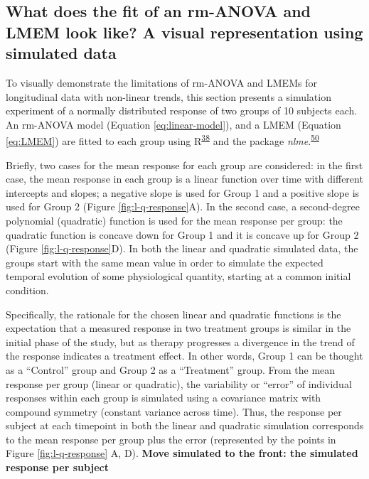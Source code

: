 \documentclass[
]{article}
\begin{document}
\hypertarget{simulation}{%
\subsection{What does the fit of an rm-ANOVA and LMEM look like? A visual representation using simulated data}\label{simulation}}

To visually demonstrate the limitations of rm-ANOVA and LMEMs for longitudinal data with non-linear trends, this section presents a simulation experiment of a normally distributed response of two groups of 10 subjects each. An rm-ANOVA model (Equation \eqref{eq:linear-model}), and a LMEM (Equation \eqref{eq:LMEM}) are fitted to each group using R\textsuperscript{\protect\hyperlink{ref-r}{38}} and the package \emph{nlme}.\textsuperscript{\protect\hyperlink{ref-nlme}{50}}

Briefly, two cases for the mean response for each group are considered: in the first case, the mean response in each group is a linear function over time with different intercepts and slopes; a negative slope is used for Group 1 and a positive slope is used for Group 2 (Figure \ref{fig:l-q-response}A). In the second case, a second-degree polynomial (quadratic) function is used for the mean response per group: the quadratic function is concave down for Group 1 and it is concave up for Group 2 (Figure \ref{fig:l-q-response}D). In both the linear and quadratic simulated data, the groups start with the same mean value in order to simulate the expected temporal evolution of some physiological quantity, starting at a common initial condition.

Specifically, the rationale for the chosen linear and quadratic functions is the expectation that a measured response in two treatment groups is similar in the initial phase of the study, but as therapy progresses a divergence in the trend of the response indicates a treatment effect. In other words, Group 1 can be thought as a ``Control'' group and Group 2 as a ``Treatment'' group. From the mean response per group (linear or quadratic), the variability or ``error'' of individual responses within each group is simulated using a covariance matrix with compound symmetry (constant variance across time). Thus, the response per subject at each timepoint in both the linear and quadratic simulation corresponds to the mean response per group plus the error (represented by the points in Figure \ref{fig:l-q-response} A, D). \textbf{Move simulated to the front: the simulated response per subject}
\end{document}
